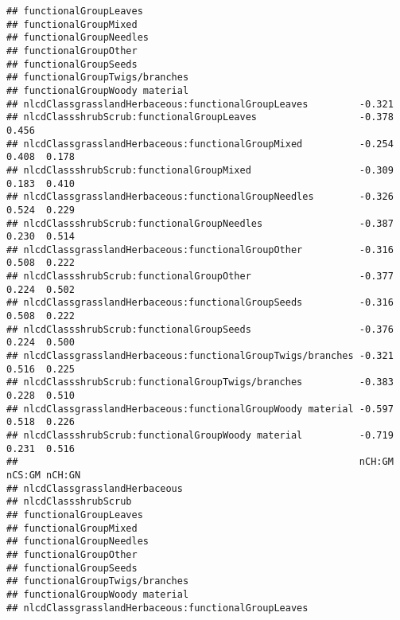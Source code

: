 \documentclass[]{article}
\begin{document}
\begin{verbatim}
## functionalGroupLeaves                                                          
## functionalGroupMixed                                                           
## functionalGroupNeedles                                                         
## functionalGroupOther                                                           
## functionalGroupSeeds                                                           
## functionalGroupTwigs/branches                                                  
## functionalGroupWoody material                                                  
## nlcdClassgrasslandHerbaceous:functionalGroupLeaves         -0.321              
## nlcdClassshrubScrub:functionalGroupLeaves                  -0.378  0.456       
## nlcdClassgrasslandHerbaceous:functionalGroupMixed          -0.254  0.408  0.178
## nlcdClassshrubScrub:functionalGroupMixed                   -0.309  0.183  0.410
## nlcdClassgrasslandHerbaceous:functionalGroupNeedles        -0.326  0.524  0.229
## nlcdClassshrubScrub:functionalGroupNeedles                 -0.387  0.230  0.514
## nlcdClassgrasslandHerbaceous:functionalGroupOther          -0.316  0.508  0.222
## nlcdClassshrubScrub:functionalGroupOther                   -0.377  0.224  0.502
## nlcdClassgrasslandHerbaceous:functionalGroupSeeds          -0.316  0.508  0.222
## nlcdClassshrubScrub:functionalGroupSeeds                   -0.376  0.224  0.500
## nlcdClassgrasslandHerbaceous:functionalGroupTwigs/branches -0.321  0.516  0.225
## nlcdClassshrubScrub:functionalGroupTwigs/branches          -0.383  0.228  0.510
## nlcdClassgrasslandHerbaceous:functionalGroupWoody material -0.597  0.518  0.226
## nlcdClassshrubScrub:functionalGroupWoody material          -0.719  0.231  0.516
##                                                            nCH:GM nCS:GM nCH:GN
## nlcdClassgrasslandHerbaceous                                                   
## nlcdClassshrubScrub                                                            
## functionalGroupLeaves                                                          
## functionalGroupMixed                                                           
## functionalGroupNeedles                                                         
## functionalGroupOther                                                           
## functionalGroupSeeds                                                           
## functionalGroupTwigs/branches                                                  
## functionalGroupWoody material                                                  
## nlcdClassgrasslandHerbaceous:functionalGroupLeaves                             

\end{verbatim}
\end{document}
